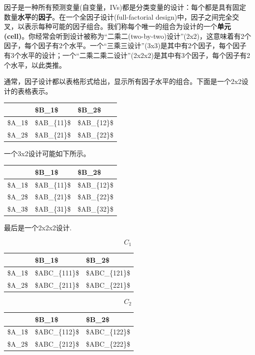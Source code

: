\documentclass[
]{book}
\begin{document}
因子是一种所有预测变量(自变量，IVs)都是分类变量的设计：每个都是具有固定数量\textbf{水平}的\textbf{因子}。在一个全因子设计(full-factorial design)中，因子之间完全交叉，以表示每种可能的因子组合。我们称每个唯一的组合为设计的一个\textbf{单元(cell)}。你经常会听到设计被称为``二乘二(two-by-two)设计''(2x2)，这意味着有2个因子，每个因子有2个水平。一个``三乘三设计''(3x3)是其中有2个因子，每个因子有3个水平的设计；一个``二乘二乘二设计''(2x2x2)是其中有3个因子，每个因子有2个水平，以此类推。

通常，因子设计都以表格形式给出，显示所有因子水平的组合。下面是一个2x2设计的表格表示。

\begin{table}
\centering
\begin{tabular}{l|l|l}
\hline
  & \$B\_1\$ & \$B\_2\$\\
\hline
\$A\_1\$ & \$AB\_\{11\}\$ & \$AB\_\{12\}\$\\
\hline
\$A\_2\$ & \$AB\_\{21\}\$ & \$AB\_\{22\}\$\\
\hline
\end{tabular}
\end{table}

一个3x2设计可能如下所示。

\begin{table}
\centering
\begin{tabular}{l|l|l}
\hline
  & \$B\_1\$ & \$B\_2\$\\
\hline
\$A\_1\$ & \$AB\_\{11\}\$ & \$AB\_\{12\}\$\\
\hline
\$A\_2\$ & \$AB\_\{21\}\$ & \$AB\_\{22\}\$\\
\hline
\$A\_3\$ & \$AB\_\{31\}\$ & \$AB\_\{32\}\$\\
\hline
\end{tabular}
\end{table}

最后是一个2x2x2设计.

\[C_1\]

\begin{table}
\centering
\begin{tabular}{l|l|l}
\hline
  & \$B\_1\$ & \$B\_2\$\\
\hline
\$A\_1\$ & \$ABC\_\{111\}\$ & \$ABC\_\{121\}\$\\
\hline
\$A\_2\$ & \$ABC\_\{211\}\$ & \$ABC\_\{221\}\$\\
\hline
\end{tabular}
\end{table}

\[C_2\]

\begin{table}
\centering
\begin{tabular}{l|l|l}
\hline
  & \$B\_1\$ & \$B\_2\$\\
\hline
\$A\_1\$ & \$ABC\_\{112\}\$ & \$ABC\_\{122\}\$\\
\hline
\$A\_2\$ & \$ABC\_\{212\}\$ & \$ABC\_\{222\}\$\\
\hline
\end{tabular}
\end{table}
\end{document}
